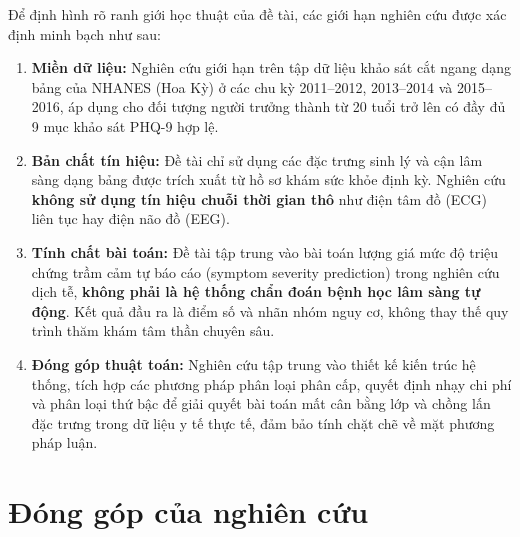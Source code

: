 Để định hình rõ ranh giới học thuật của đề tài, các giới hạn nghiên cứu được xác định minh bạch như sau:
\begin{enumerate}
    \item \textbf{Miền dữ liệu:} Nghiên cứu giới hạn trên tập dữ liệu khảo sát cắt ngang dạng bảng của NHANES (Hoa Kỳ) ở các chu kỳ 2011--2012, 2013--2014 và 2015--2016, áp dụng cho đối tượng người trưởng thành từ 20 tuổi trở lên có đầy đủ 9 mục khảo sát PHQ-9 hợp lệ.
    \item \textbf{Bản chất tín hiệu:} Đề tài chỉ sử dụng các đặc trưng sinh lý và cận lâm sàng dạng bảng được trích xuất từ hồ sơ khám sức khỏe định kỳ. Nghiên cứu \textbf{không sử dụng tín hiệu chuỗi thời gian thô} như điện tâm đồ (ECG) liên tục hay điện não đồ (EEG).
    \item \textbf{Tính chất bài toán:} Đề tài tập trung vào bài toán lượng giá mức độ triệu chứng trầm cảm tự báo cáo (symptom severity prediction) trong nghiên cứu dịch tễ, \textbf{không phải là hệ thống chẩn đoán bệnh học lâm sàng tự động}. Kết quả đầu ra là điểm số và nhãn nhóm nguy cơ, không thay thế quy trình thăm khám tâm thần chuyên sâu.
    \item \textbf{Đóng góp thuật toán:} Nghiên cứu tập trung vào thiết kế kiến trúc hệ thống, tích hợp các phương pháp phân loại phân cấp, quyết định nhạy chi phí và phân loại thứ bậc để giải quyết bài toán mất cân bằng lớp và chồng lấn đặc trưng trong dữ liệu y tế thực tế, đảm bảo tính chặt chẽ về mặt phương pháp luận.
\end{enumerate}

\section{Đóng góp của nghiên cứu}
\label{sec:dong-gop-nghien-cuu}

